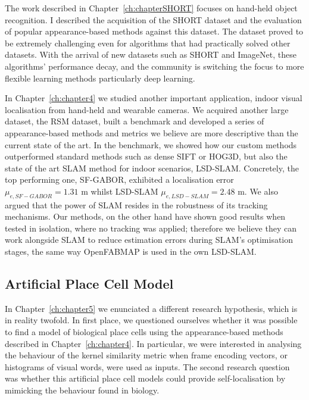 The work described in Chapter~\ref{ch:chapterSHORT} focuses on hand-held object recognition. I described the acquisition of the SHORT dataset and the evaluation of popular appearance-based methods against this dataset. The dataset proved to be extremely challenging even for algorithms that had practically solved other datasets. With the arrival of new datasets such as SHORT and ImageNet, these algorithms' performance decay, and the community is switching the focus to more flexible learning methods particularly deep learning.

In Chapter~\ref{ch:chapter4} we studied another important application, indoor visual localisation from hand-held and wearable cameras. We acquired another large dataset, the RSM dataset, built a benchmark and developed a series of appearance-based methods and metrics we believe are more descriptive than the current state of the art. In the benchmark, we showed how our custom methods outperformed standard methods such as dense SIFT or HOG3D, but also the state of the art SLAM method for indoor scenarios, LSD-SLAM. Concretely, the top performing one, SF-GABOR, exhibited a localisation error $\mu_{e,SF-GABOR} = 1.31 $ m whilst LSD-SLAM $\mu_{e,LSD-SLAM} = 2.48 $ m.  We also argued that the power of SLAM resides in the robustness of its tracking mechanisms. Our methods, on the other hand have shown good results when tested in isolation, where no tracking was applied; therefore we believe they can work alongside SLAM to reduce estimation errors during SLAM's optimisation stages, the same way OpenFABMAP is used in the own LSD-SLAM.


\subsection{Artificial Place Cell Model}

In Chapter~\ref{ch:chapter5} we enunciated a different research hypothesis, which is in reality twofold. In first place, we questioned ourselves whether it was possible to find  a model of biological place cells using the appearance-based methods described in Chapter~\ref{ch:chapter4}. In particular, we were interested in analysing the behaviour of the kernel similarity metric when frame encoding vectors, or histograms of visual words, were used as inputs. The second research question was whether this artificial place cell models could provide self-localisation by mimicking the behaviour found in biology.

